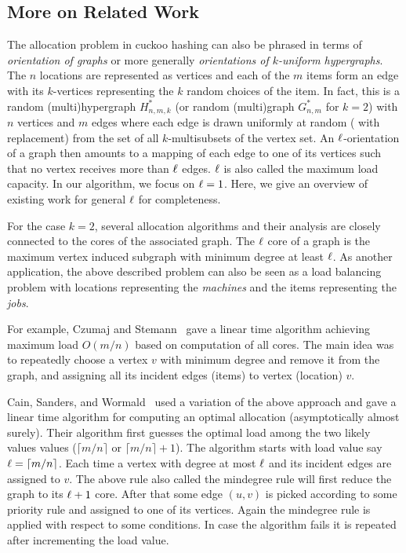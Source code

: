 \subsection{More on Related Work}
The allocation problem in cuckoo hashing can also be phrased in terms of \emph{orientation of graphs} or more generally \emph{orientations of $k$-uniform hypergraphs}. The $n$ locations are represented as vertices and each of the $m$ items form an edge with its $k$-vertices representing the $k$ random choices of the item.
In fact, this is a random (multi)hypergraph $H^*_{n,m,k}$ (or random (multi)graph $G^*_{n,m}$ for $k=2$) with $n$ vertices and $m$ edges where each edge is drawn uniformly at random ( with replacement) from the set of all $k$-multisubsets of the vertex set. An $\ell$-orientation of a graph then amounts to a mapping of each edge to one of its vertices such that no vertex receives more than $\ell$ edges. $\ell$ is also called the maximum load capacity. In our algorithm, we focus on $\ell=1$. Here, we give an overview of existing work for general $\ell$ for completeness.

For the case $k = 2$, several allocation algorithms and their analysis are closely connected to the cores of the associated
graph. The $\ell$ core of a graph is the maximum vertex induced subgraph with minimum degree at least $\ell$. As another application, the above described problem can also be seen as a load balancing problem with locations representing the \emph{machines} and the items representing the \emph{jobs}.

For example, Czumaj and Stemann~\cite{ina:cs01} gave a linear time algorithm achieving maximum load $O(m/n)$ based on computation of all cores. The main idea was to repeatedly choose a
vertex $v$ with minimum degree and remove it from the
graph, and assigning all its incident edges (items) to vertex (location) $v$. 

Cain, Sanders, and Wormald~\cite{1283433}  used a variation of the above approach and gave a linear time algorithm for computing an optimal allocation (asymptotically almost surely). Their algorithm first guesses the optimal load among the two likely values values ($\lceil m/n\rceil $ or $\lceil m/n\rceil +1$). The algorithm starts with load value say $\ell=\lceil m/n\rceil $. Each time a vertex with degree at most $\ell$ and its incident edges are assigned to $v$. The above rule also called the mindegree rule will first reduce the graph to its $\ell+1$ core. After that some edge $(u,v)$ is picked according to some priority rule and assigned to one of its vertices. Again the mindegree rule is applied with respect to some conditions. In case the algorithm fails it is repeated after incrementing the load value.

